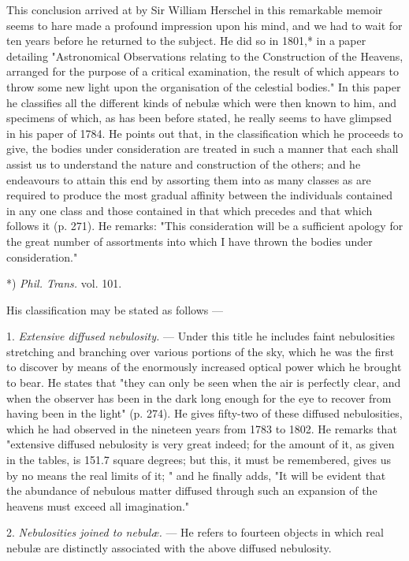 \documentclass[a4paper, 12pt, oneside, polutonikogreek, english]{article}
\begin{document}
This conclusion arrived at by Sir William Herschel in this remarkable memoir seems to hare made a profound impression upon his mind, and we had to wait for ten years before he returned to the subject. He did so in 1801,* in a paper detailing "Astronomical Observations relating to the Construction of the Heavens, arranged for the purpose of a critical examination, the result of which appears to throw some new light upon the organisation of the celestial bodies." In this paper he classifies all the different kinds of nebulæ which were then known to him, and specimens of which, as has been before stated, he really seems to have glimpsed in his paper of 1784. He points out that, in the classification which he proceeds to give, the bodies under consideration are treated in such a manner that each shall assist us to understand the nature and construction of the others; and he endeavours to attain this end by assorting them into as many classes as are required to produce the most gradual affinity between the individuals contained in any one class and those contained in that which precedes and that which follows it (p. 271). He remarks: "This consideration will be a sufficient apology for the great number of assortments into which I have thrown the bodies under consideration."

*) \emph{Phil. Trans.} vol. 101.

His classification may be stated as follows ---

1. \emph{Extensive diffused nebulosity.} --- Under this title he includes faint nebulosities stretching and branching over various portions of the sky, which he was the first to discover by means of the enormously increased optical power which he brought to bear. He states that "they can only be seen when the air is perfectly clear, and when the observer has been in the dark long enough for the eye to recover from having been in the light" (p. 274). He gives fifty-two of these diffused nebulosities, which he had observed in the nineteen years from 1783 to 1802. He remarks that "extensive diffused nebulosity is very great indeed; for the amount of it, as given in the tables, is 151.7 square degrees; but this, it must be remembered, gives us by no means the real limits of it; " and he finally adds, "It will be evident that the abundance of nebulous matter diffused through such an expansion of the heavens must exceed all imagination."

2. \emph{Nebulosities joined to nebulæ.} --- He refers to fourteen objects in which real nebulæ are distinctly associated with the above diffused nebulosity.
\end{document}
